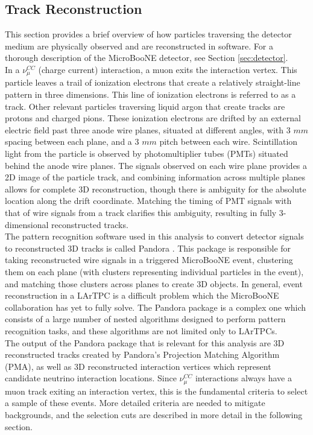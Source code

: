 \subsection{Track Reconstruction}
This section provides a brief overview of how particles traversing the detector medium are physically observed and are reconstructed in software. For a thorough description of the MicroBooNE detector, see Section \ref{sec:detector}.\\

In a $\nu_\mu^{CC}$ (charge current) interaction, a muon exits the interaction vertex. This particle leaves a trail of ionization electrons that create a relatively straight-line pattern in three dimensions. This line of ionization electrons is referred to as a track. Other relevant particles traversing liquid argon that create tracks are protons and charged pions. These ionization electrons are drifted by an external electric field past three anode wire planes, situated at different angles, with 3 $mm$ spacing between each plane, and a 3 $mm$ pitch between each wire. Scintillation light from the particle is observed by photomultiplier tubes (PMTs) situated behind the anode wire planes. The signals observed on each wire plane provides a 2D image of the particle track, and combining information across multiple planes allows for complete 3D reconstruction, though there is ambiguity for the absolute location along the drift coordinate. Matching the timing of PMT signals with that of wire signals from a track clarifies this ambiguity, resulting in fully 3-dimensional reconstructed tracks.\\

The pattern recognition software used in this analysis to convert detector signals to reconstructed 3D tracks is called Pandora \cite{pandora_paper}. This package is responsible for taking reconstructed wire signals in a triggered MicroBooNE event, clustering them on each plane (with clusters representing individual particles in the event), and matching those clusters across planes to create 3D objects. In general, event reconstruction in a LArTPC is a difficult problem which the MicroBooNE collaboration has yet to fully solve. The Pandora package is a complex one which consists of a large number of nested algorithms designed to perform pattern recognition tasks, and these algorithms are not limited only to LArTPCs.\\

The output of the Pandora package that is relevant for this analysis are 3D reconstructed tracks created by Pandora's Projection Matching Algorithm (PMA), as well as 3D reconstructed interaction vertices which represent candidate neutrino interaction locations. Since $\nu_\mu^{CC}$ interactions always have a muon track exiting an interaction vertex, this is the fundamental criteria to select a sample of these events. More detailed criteria are needed to mitigate backgrounds, and the selection cuts are described in more detail in the following section.

